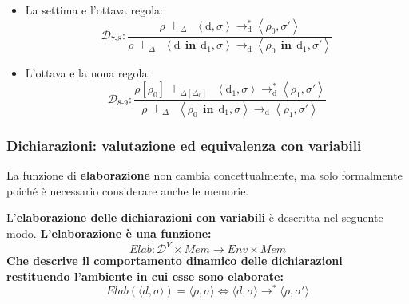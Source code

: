 \documentclass[a4paper]{article}
\begin{document}
\begin{itemize}
 		\item La settima e l'ottava regola:
 		\begin{equation*}
 			\mathcal{D}_{7\text{-}8} : \dfrac{
 				\rho \:\: \vdash_{\Delta} \:\: \left\langle \mathrm{d}, \sigma \right\rangle \rightarrow_{\mathrm{d}}^{*} \left\langle \rho_{0}, \sigma' \right\rangle
 			}{
 				\rho \:\: \vdash_{\Delta} \:\: \left\langle \mathrm{d} \:\: \mathbf{in} \:\: \mathrm{d}_{1}, \sigma \right\rangle \rightarrow_{\mathrm{d}} \left\langle \rho_{0} \:\: \mathbf{in} \:\: \mathrm{d}_{1}, \sigma' \right\rangle
 			}
 		\end{equation*}
 		
 		\item L'ottava e la nona regola:
 		\begin{equation*}
 			\mathcal{D}_{8\text{-}9} : \dfrac{
 				\rho\left[\rho_{0}\right] \:\: \vdash_{\Delta\left[\Delta_{0}\right]} \:\: \left\langle \mathrm{d}_{1}, \sigma \right\rangle \rightarrow^{*}_{\mathrm{d}} \left\langle \rho_{1}, \sigma' \right\rangle
 			}{
 				\rho \:\: \vdash_{\Delta} \:\: \left\langle \rho_{0} \:\: \mathbf{in} \:\: \mathrm{d}_{1}, \sigma \right\rangle \rightarrow_{\mathrm{d}} \left\langle \rho_{1}, \sigma' \right\rangle
 			}
 		\end{equation*}
 	\end{itemize}\newpage
 	
 	\subsubsection{Dichiarazioni: valutazione ed equivalenza con variabili}
 	
 	La funzione di \textbf{elaborazione} non cambia concettualmente, ma solo formalmente poiché è necessario considerare anche le memorie.
 	
 	\begin{boxdef}
 		L'\textcolor{Red3}{\textbf{elaborazione delle dichiarazioni con variabili}} è descritta nel seguente modo. \textbf{L'elaborazione è una funzione:}
 		\begin{equation*}
 			Elab: \mathcal{D}^{V} \times Mem \longrightarrow Env \times Mem
 		\end{equation*}
 		\textbf{Che descrive il comportamento dinamico delle dichiarazioni restituendo l'ambiente in cui esse sono elaborate:}
 		\begin{equation*}
 			Elab\left(\langle d,\sigma \rangle\right) = \langle \rho,\sigma \rangle \iff \langle d,\sigma \rangle \longrightarrow^{*} \langle \rho,\sigma' \rangle
 		\end{equation*}
 	\end{boxdef}\:\newline
 	
\end{document}
